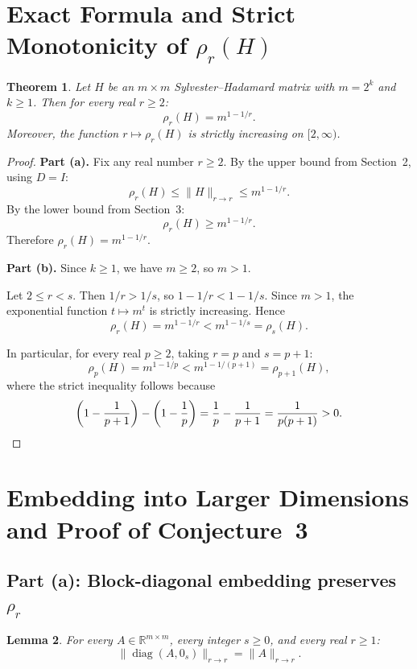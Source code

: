 \documentclass{article}
\newtheorem{theorem}{Theorem}
\newtheorem{lemma}[theorem]{Lemma}
\begin{document}
\section{Exact Formula and Strict Monotonicity of $\rho_r(H)$}

\begin{theorem}\label{thm:rho-formula}
Let $H$ be an $m \times m$ Sylvester--Hadamard matrix with $m = 2^k$ and $k \geq 1$. Then for every real $r \geq 2$:
\[
\rho_r(H) = m^{1-1/r}.
\]
Moreover, the function $r \mapsto \rho_r(H)$ is strictly increasing on $[2, \infty)$.
\end{theorem}

\begin{proof}
\textbf{Part (a).} Fix any real number $r \geq 2$. By the upper bound from Section~2, using $D = I$:
\[
\rho_r(H) \leq \|H\|_{r \to r} \leq m^{1 - 1/r}.
\]
By the lower bound from Section~3:
\[
\rho_r(H) \geq m^{1 - 1/r}.
\]
Therefore $\rho_r(H) = m^{1 - 1/r}$.

\medskip

\textbf{Part (b).} Since $k \geq 1$, we have $m \geq 2$, so $m > 1$.

Let $2 \leq r < s$. Then $1/r > 1/s$, so $1 - 1/r < 1 - 1/s$. Since $m > 1$, the exponential function $t \mapsto m^t$ is strictly increasing. Hence
\[
\rho_r(H) = m^{1 - 1/r} < m^{1 - 1/s} = \rho_s(H).
\]

In particular, for every real $p \geq 2$, taking $r = p$ and $s = p+1$:
\[
\rho_p(H) = m^{1-1/p} < m^{1-1/(p+1)} = \rho_{p+1}(H),
\]
where the strict inequality follows because
\[
\left(1 - \frac{1}{p+1}\right) - \left(1 - \frac{1}{p}\right) = \frac{1}{p} - \frac{1}{p+1} = \frac{1}{p(p+1)} > 0. \qedhere
\]
\end{proof}

\section{Embedding into Larger Dimensions and Proof of Conjecture~3}

\subsection*{Part (a): Block-diagonal embedding preserves $\rho_r$}

\begin{lemma}\label{lem:block-norm}
For every $A\in\mathbb{R}^{m\times m}$, every integer $s \geq 0$, and every real $r \geq 1$:
\[
\|\operatorname{diag}(A, 0_s)\|_{r\to r} = \|A\|_{r\to r}.
\]
\end{lemma}
\end{document}
